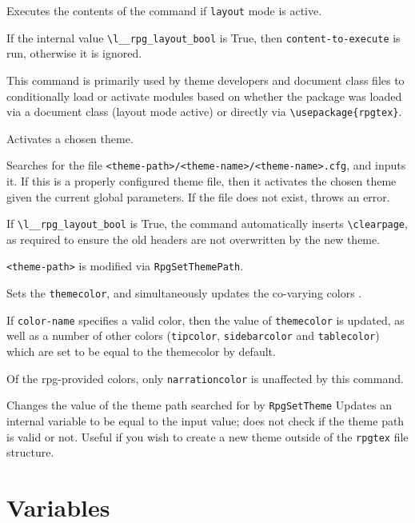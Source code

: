 		\begin{macrolist}
				{
					Executes the contents of the command if \verb|layout| mode is active.
				}
				{
				}
				{
					If the internal value \texttt{\textbackslash{}l\_\_rpg\_layout\_bool} is True, then \verb|content-to-execute| is run, otherwise it is ignored.

					This command is primarily used by theme developers and document class files to conditionally load or activate modules based on whether the package was loaded via a document class (layout mode active) or directly via \verb|\usepackage{rpgtex}|.
				}
				{
					Activates a chosen theme.
				}
				{
				}
				{
					Searches for the file \verb|<theme-path>/<theme-name>/<theme-name>.cfg|, and inputs it. If this is a properly configured theme file, then it activates the chosen theme given the current global parameters. If the file does not exist, throws an error.

					If   \texttt{\textbackslash{}l\_\_rpg\_layout\_bool} is True, the command automatically inserts \verb|\clearpage|, as required to ensure the old headers are not overwritten by the new theme.

					\verb|<theme-path>| is modified via \verb|RpgSetThemePath|.
				}

				{\label{Macro:SetThemeColor}
					Sets the \verb|themecolor|, and simultaneously updates the co-varying colors .
				}{
				}{
					If \verb|color-name| specifies a valid color, then the value of \verb|themecolor| is updated, as well as a number of other colors (\verb|tipcolor|, \verb|sidebarcolor| and \verb|tablecolor|) which are set to be equal to the themecolor by default.

					Of the rpg-provided colors, only \verb|narrationcolor| is unaffected by this command.
				}
				{
					Changes the value of the theme path searched for by \verb|RpgSetTheme|
				}
				{
				}
				{
					Updates an internal variable to be equal to the input value; does not check if the theme path is valid or not. Useful if you wish to create a new theme outside of the \verb|rpgtex| file structure.
				}
		\end{macrolist}
	\section{Variables}
